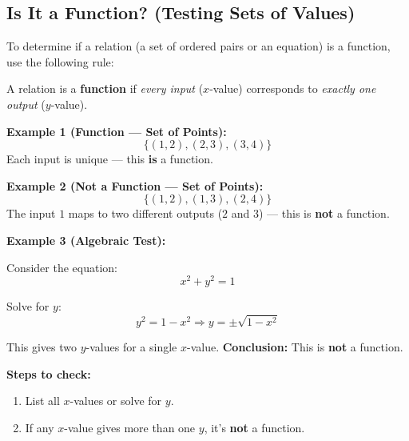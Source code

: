 \documentclass[11pt]{article}
\begin{document}
\subsection{Is It a Function? (Testing Sets of Values)}

To determine if a relation (a set of ordered pairs or an equation) is a function, use the following rule:

\begin{tcolorbox}[colback=yellow!5!white, colframe=yellow!80!black, title=Function Test]
A relation is a \textbf{function} if \emph{every input} (\( x \)-value) corresponds to \emph{exactly one output} (\( y \)-value).
\end{tcolorbox}

\textbf{Example 1 (Function — Set of Points):}
\[
\{ (1, 2), (2, 3), (3, 4) \}
\]
Each input is unique — this \textbf{is} a function.

\medskip

\textbf{Example 2 (Not a Function — Set of Points):}
\[
\{ (1, 2), (1, 3), (2, 4) \}
\]
The input \( 1 \) maps to two different outputs (\( 2 \) and \( 3 \)) — this is \textbf{not} a function.

\bigskip

\textbf{Example 3 (Algebraic Test):}

Consider the equation:
\[
x^2 + y^2 = 1
\]

Solve for \( y \):
\[
y^2 = 1 - x^2 \Rightarrow y = \pm \sqrt{1 - x^2}
\]

This gives two \( y \)-values for a single \( x \)-value.
\textbf{Conclusion:} This is \textbf{not} a function.

\bigskip

\textbf{Steps to check:}
\begin{enumerate}
  \item List all \( x \)-values or solve for \( y \).
  \item If any \( x \)-value gives more than one \( y \), it's \textbf{not} a function.
\end{enumerate}
\end{document}
